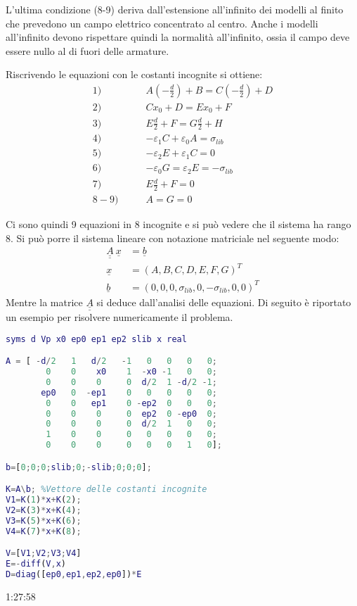 L'ultima condizione (8-9) deriva dall'estensione all'infinito dei modelli al 
finito che prevedono un campo elettrico concentrato al centro. Anche i modelli
all'infinito devono rispettare quindi la normalità all'infinito, ossia il
campo deve essere nullo al di fuori delle armature.

Riscrivendo le equazioni con le costanti incognite si ottiene:
\begin{align*}
1)   \qquad & A\left(-\frac{d}{2}\right) + B = C\left(-\frac{d}{2}\right) + D \\
2)   \qquad & Cx_0 + D = Ex_0 + F \\
3)   \qquad &E\frac{d}{2} + F = G \frac{d}{2} + H \\
4)   \qquad &- \varepsilon_1 C + \varepsilon_0 A = \sigma_{lib} \\
5)   \qquad &- \varepsilon_2 E + \varepsilon_1 C = 0 \\
6)   \qquad &-\varepsilon_0G = \varepsilon_2 E = -\sigma_{lib} \\
7)   \qquad & E\frac{d}{2} + F = 0 \\
8-9) \qquad & A = G = 0
\end{align*}

Ci sono quindi 9 equazioni in 8 incognite e si può vedere che il sistema 
ha rango 8.
Si può porre il sistema lineare con notazione matriciale nel seguente modo:
\begin{align*}
\underline{\underline{A}}\ \underline{x} &= \underline{b}\\
\underline{x} &= \left(A,B,C,D,E,F,G\right)^T \\
\underline{b} &= \left(0,0,0,\sigma_{lib},0,-\sigma_{lib},0,0\right)^T 
\end{align*}
Mentre la matrice $\underline{\underline{A}}$ si deduce dall'analisi delle 
equazioni. 
\newpage
Di seguito è riportato un esempio per risolvere numericamente
il problema.
\begin{lstlisting}[style=Matlab-editor,language = Matlab]
syms d Vp x0 ep0 ep1 ep2 slib x real

A = [ -d/2   1   d/2   -1   0   0   0   0;
        0    0    x0    1  -x0 -1   0   0;
        0    0    0     0  d/2  1 -d/2 -1;
       ep0   0  -ep1    0   0   0   0   0;
        0    0   ep1    0 -ep2  0   0   0;
        0    0    0     0  ep2  0 -ep0  0;
        0    0    0     0  d/2  1   0   0;
        1    0    0     0   0   0   0   0;
        0    0    0     0   0   0   1   0];

b=[0;0;0;slib;0;-slib;0;0;0];

K=A\b; %Vettore delle costanti incognite
V1=K(1)*x+K(2);
V2=K(3)*x+K(4);
V3=K(5)*x+K(6);
V4=K(7)*x+K(8);

V=[V1;V2;V3;V4]
E=-diff(V,x)
D=diag([ep0,ep1,ep2,ep0])*E
\end{lstlisting}
1:27:58

